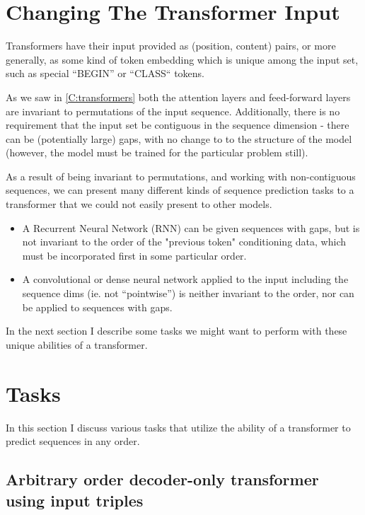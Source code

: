 \section{Changing The Transformer Input}
\label{s:transformer-inputs}

Transformers have their input provided as (position, content) pairs, or more generally, as some kind of token embedding which is unique among the input set, such as special ``BEGIN'' or ``CLASS`` tokens.

As we saw in \cref{C:transformers} both the attention layers and feed-forward layers are invariant to permutations of the input sequence. Additionally, there is no requirement that the input set be contiguous in the sequence dimension - there can be (potentially large) gaps, with no change to to the structure of the model (however, the model must be trained for the particular problem still).

As a result of being invariant to permutations, and working with non-contiguous sequences, we can present many different kinds of sequence prediction tasks to a transformer that we could not easily present to other models.

\begin{itemize}
    \item A Recurrent Neural Network (RNN) can be given sequences with gaps, but is not invariant to the order of the "previous token" conditioning data, which must be incorporated first in some particular order.
    \item A convolutional or dense neural network applied to the input including the sequence dims (ie. not ``pointwise'') is neither invariant to the order, nor can be applied to sequences with gaps.
\end{itemize}

In the next section I describe some tasks we might want to perform with these unique abilities of a transformer.

\section{Tasks}
\label{s:order-tasks}

In this section I discuss various tasks that utilize the ability of a transformer to predict sequences in any order.

\subsection{Arbitrary order decoder-only transformer using input triples}
\label{ss:decoder-only-triples}

